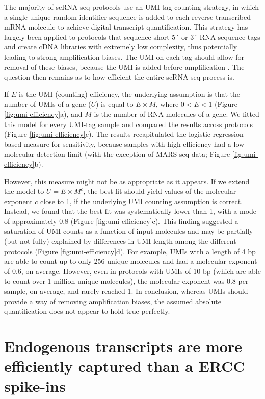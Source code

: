 The majority of scRNA-seq protocols use an UMI-tag-counting strategy, in which a single unique random identifier sequence is added to each reverse-transcribed mRNA molecule to achieve digital transcript quantification. This strategy has largely been applied to protocols that sequence short 5´ or 3´ RNA sequence tags and create cDNA libraries with extremely low complexity, thus potentially leading to strong amplification biases. The UMI on each tag should allow for removal of these biases, because the UMI is added before amplification  \cite{Islam2014-dx}. The question then remains as to how efficient the entire scRNA-seq process is.

If \( E \) is the UMI (counting) efficiency, the underlying assumption is that the number of UMIs of a gene (\( U \)) is equal to \( E \times M \), where \( 0 < E < 1 \) (Figure \ref{fig:umi-efficiency}a), and \( M \) is the number of RNA molecules of a gene. We fitted this model for every UMI-tag sample and compared the results across protocols (Figure \ref{fig:umi-efficiency}c). The results recapitulated the logistic-regression-based measure for sensitivity, because samples with high efficiency had a low molecular-detection limit (with the exception of MARS-seq data; Figure \ref{fig:umi-efficiency}b).

However, this measure might not be as appropriate as it appears. If we extend the model to \( U = E \times M^c \), the best fit should yield values of the molecular exponent \( c \) close to 1, if the underlying UMI counting assumption is correct. Instead, we found that the best fit was systematically lower than 1, with a mode of approximately 0.8 (Figure \ref{fig:umi-efficiency}c). This finding suggested a saturation of UMI counts as a function of input molecules and may be partially (but not fully) explained by differences in UMI length among the different protocols (Figure \ref{fig:umi-efficiency}d). For example, UMIs with a length of 4 bp are able to count up to only 256 unique molecules and had a molecular exponent of 0.6, on average. However, even in protocols with UMIs of 10 bp (which are able to count over 1 million unique molecules), the molecular exponent was 0.8 per sample, on average, and rarely reached 1. In conclusion, whereas UMIs should provide a way of removing amplification biases, the assumed absolute quantification does not appear to hold true perfectly.

\section{Endogenous transcripts are more efficiently captured than a ERCC spike-ins}

